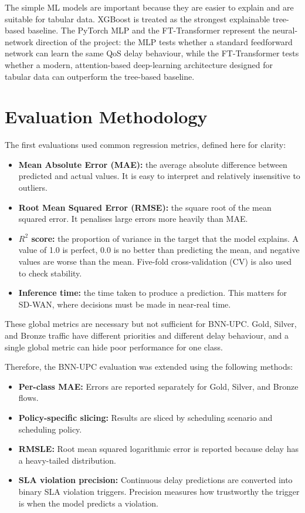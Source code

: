 \documentclass[a4paper,12pt]{Classes/RoboticsLaTeX}
\begin{document}
The simple ML models are important because they are easier to explain and are suitable for tabular data. XGBoost is treated as the strongest explainable tree-based baseline. The PyTorch MLP and the FT-Transformer represent the neural-network direction of the project: the MLP tests whether a standard feedforward network can learn the same QoS delay behaviour, while the FT-Transformer tests whether a modern, attention-based deep-learning architecture designed for tabular data can outperform the tree-based baseline.

\section{Evaluation Methodology}

The first evaluations used common regression metrics, defined here for clarity:

\begin{itemize}
    \item \textbf{Mean Absolute Error (MAE):} the average absolute difference between predicted and actual values. It is easy to interpret and relatively insensitive to outliers.
    \item \textbf{Root Mean Squared Error (RMSE):} the square root of the mean squared error. It penalises large errors more heavily than MAE.
    \item \textbf{$R^2$ score:} the proportion of variance in the target that the model explains. A value of 1.0 is perfect, 0.0 is no better than predicting the mean, and negative values are worse than the mean. Five-fold cross-validation (CV) is also used to check stability.
    \item \textbf{Inference time:} the time taken to produce a prediction. This matters for SD-WAN, where decisions must be made in near-real time.
\end{itemize}

These global metrics are necessary but not sufficient for BNN-UPC. Gold, Silver, and Bronze traffic have different priorities and different delay behaviour, and a single global metric can hide poor performance for one class.

Therefore, the BNN-UPC evaluation was extended using the following methods:

\begin{itemize}
    \item \textbf{Per-class MAE:} Errors are reported separately for Gold, Silver, and Bronze flows.
    \item \textbf{Policy-specific slicing:} Results are sliced by scheduling scenario and scheduling policy.
    \item \textbf{RMSLE:} Root mean squared logarithmic error is reported because delay has a heavy-tailed distribution.
    \item \textbf{SLA violation precision:} Continuous delay predictions are converted into binary SLA violation triggers. Precision measures how trustworthy the trigger is when the model predicts a violation.
\end{itemize}
\end{document}
